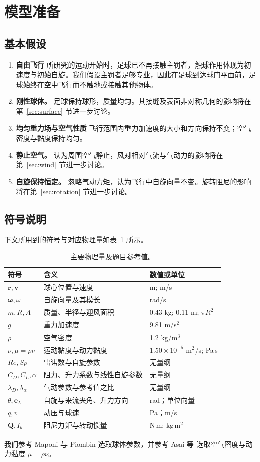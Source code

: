 \documentclass[12pt,letterpaper]{article}
\begin{document}
\section{模型准备}
\subsection{基本假设}
\begin{enumerate}
\item \textbf{自由飞行} 所研究的运动开始时，足球已不再接触主罚者，触球作用体现为初速度与初始自旋。我们假设主罚者足够专业，因此在足球到达球门平面前，足球始终在空中飞行而不触地或接触其他物体。
\item \textbf{刚性球体。} 足球保持球形，质量均匀。其接缝及表面非对称几何的影响将在第~\ref{sec:surface} 节进一步讨论。
\item \textbf{均匀重力场与空气性质} 飞行范围内重力加速度的大小和方向保持不变；空气密度与黏度保持均匀。
\item \textbf{静止空气。} 认为周围空气静止，风对相对气流与气动力的影响将在第~\ref{sec:wind} 节进一步讨论。
\item \textbf{自旋保持恒定。} 忽略气动力矩，认为飞行中自旋向量不变。旋转阻尼的影响将在第~\ref{sec:rotation} 节进一步讨论。
\end{enumerate}

\subsection{符号说明}
下文所用到的符号与对应物理量如表~\ref{tab:notations} 所示。
\begin{table}[H]\centering\small
\caption{主要物理量及题目参考值。}\label{tab:notations}
\begin{tabular}{p{}p{}p{}}\toprule
符号 & 含义 & 数值或单位\\\midrule
$\boldsymbol r,\boldsymbol v$ & 球心位置与速度 & m; m/s\\
$\boldsymbol\omega,\omega$ & 自旋向量及其模长 & rad/s\\
$m,R,A$ & 质量、半径与迎风面积 & 0.43 kg; 0.11 m; $\pi R^2$\\
$g$ & 重力加速度 & 9.81 m/s$^2$\\
$\rho$ & 空气密度 & 1.2 kg/m$^3$\\
$\nu,\mu=\rho\nu$ & 运动黏度与动力黏度 & $1.50\times10^{-5}$ m$^2$/s; Pa\,s\\
$Re,Sp$ & 雷诺数与自旋参数 & 无量纲\\
$C_D,C_L,\alpha$ & 阻力、升力系数与线性自旋参数 & 无量纲\\
$\lambda_D,\lambda_\alpha$ & 气动参数与参考值之比 & 无量纲\\
$\theta,\boldsymbol e_L$ & 自旋与来流夹角、升力方向 & rad；单位向量\\
$q,v$ & 动压与球速 & Pa；m/s\\
$\boldsymbol Q,I_b$ & 阻尼力矩与转动惯量 & N\,m; kg\,m$^2$\\\bottomrule
\end{tabular}\end{table}
我们参考 Maponi 与 Piombin\cite{maponi} 选取球体参数，并参考 Asai 等\cite{asai2007} 选取空气密度与动力黏度 $\mu=\rho\nu$。
\end{document}
